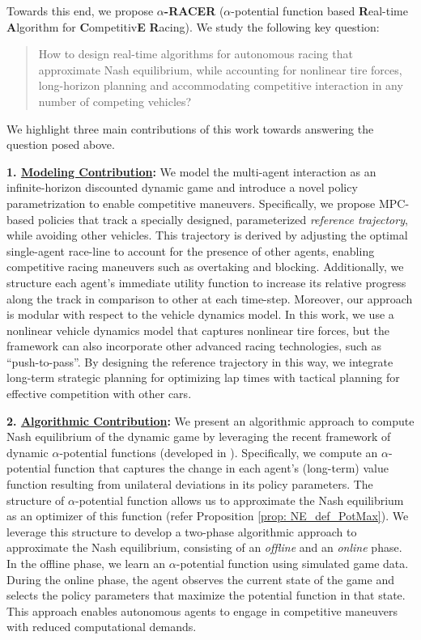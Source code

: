 Towards this end, we propose \textbf{$\alpha$-RACER} ($\alpha$-potential function based \textbf{R}eal-time \textbf{A}lgorithm for \textbf{C}ompetitiv\textbf{E} \textbf{R}acing). We study the following key question:
\begin{quote}
    How to design real-time algorithms for  autonomous racing that approximate Nash equilibrium, while accounting for nonlinear tire forces, long-horizon planning and accommodating competitive interaction in any number of competing vehicles?
\end{quote}
We highlight three main contributions of this work towards answering the question posed above.

\noindent\textbf{1. \underline{Modeling Contribution}:} We model the multi-agent interaction as an infinite-horizon discounted dynamic game and introduce a novel policy parametrization to enable competitive maneuvers. Specifically, we propose MPC-based policies that track a specially designed, parameterized \textit{reference trajectory}, while avoiding other vehicles. This trajectory is derived by adjusting the optimal single-agent race-line to account for the presence of other agents, enabling competitive racing maneuvers such as overtaking and blocking. Additionally, we structure each agent’s immediate utility function to increase its relative progress along the track in comparison to other at each time-step.
Moreover, our approach is modular with respect to the vehicle dynamics model. In this work, we use a nonlinear vehicle dynamics model that captures nonlinear tire forces, but the framework can also incorporate other advanced racing technologies, such as ``push-to-pass''. By designing the reference trajectory in this way, we integrate long-term strategic planning for optimizing lap times with tactical planning for effective competition with other cars.

\noindent\textbf{2. \underline{Algorithmic Contribution}:}
We present an algorithmic approach to compute Nash equilibrium of the dynamic game by leveraging the recent framework of dynamic \(\alpha\)-potential functions (developed in \citep{guo2023markov, maheshwari2024decentralized, guo2024alpha}). Specifically, we compute an \(\alpha\)-potential function that captures the change in each agent's (long-term) value function resulting from unilateral deviations in its policy parameters. The structure of \(\alpha\)-potential function allows us to approximate the Nash equilibrium as an optimizer of this function (refer Proposition \ref{prop: NE_def_PotMax}).
We leverage this structure to develop a two-phase algorithmic approach to approximate the Nash equilibrium, consisting of an \textit{offline} and an \textit{online} phase. In the offline phase, we learn an \(\alpha\)-potential function using simulated game data. During the online phase, the agent observes the current state of the game and selects the policy parameters that maximize the potential function in that state. This approach enables autonomous agents to engage in competitive maneuvers with reduced computational demands.


